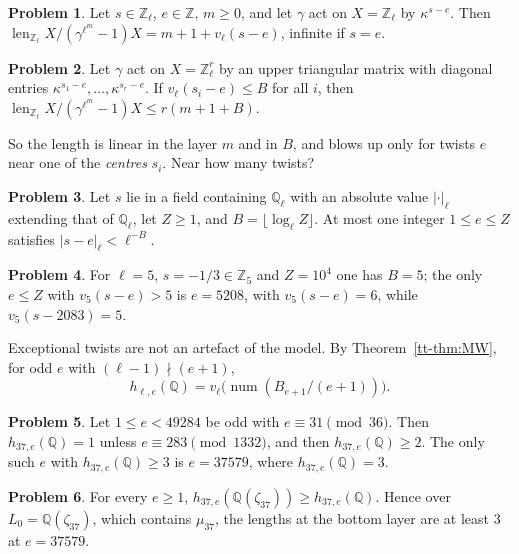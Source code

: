 \documentclass[reqno]{amsart}
\theoremstyle{definition}
\newtheorem{problem}{Problem}[section]
\theoremstyle{plain}
\theoremstyle{remark}
\newcommand{\Z}{\mathbb{Z}}
\newcommand{\Q}{\mathbb{Q}}
\newcommand{\Zl}{\Z_\ell}
\newcommand{\Ql}{\Q_\ell}
\newcommand{\len}{\operatorname{len}}
\newcommand{\num}{\operatorname{num}}
\begin{document}
\begin{problem}\label{pr:rank-one}
Let \(s\in\Zl\), \(e\in\Z\), \(m\ge0\), and let \(\gamma\) act on \(X=\Zl\) by \(\kappa^{s-e}\).  Then \(\len_{\Zl}X/(\gamma^{\ell^m}-1)X=m+1+v_\ell(s-e)\), infinite if \(s=e\).
\end{problem}

\begin{problem}\label{pr:triangular}
Let \(\gamma\) act on \(X=\Zl^r\) by an upper triangular matrix with diagonal entries \(\kappa^{s_1-e},\dots,\kappa^{s_r-e}\).  If \(v_\ell(s_i-e)\le B\) for all \(i\), then \(\len_{\Zl}X/(\gamma^{\ell^m}-1)X\le r(m+1+B)\).
\end{problem}

So the length is linear in the layer \(m\) and in \(B\), and blows up only for twists \(e\) near one of the \emph{centres} \(s_i\).  Near how many twists?

\begin{problem}\label{pr:one-near}
Let \(s\) lie in a field containing \(\Ql\) with an absolute value \(\lvert\cdot\rvert_\ell\) extending that of \(\Ql\), let \(Z\ge1\), and \(B=\lfloor\log_\ell Z\rfloor\).  At most one integer \(1\le e\le Z\) satisfies \(\lvert s-e\rvert_\ell<\ell^{-B}\).
\end{problem}

\begin{problem}\label{pr:one-near-example}
For \(\ell=5\), \(s=-1/3\in\Z_5\) and \(Z=10^4\) one has \(B=5\); the only \(e\le Z\) with \(v_5(s-e)>5\) is \(e=5208\), with \(v_5(s-e)=6\), while \(v_5(s-2083)=5\).
\end{problem}

Exceptional twists are not an artefact of the model.  By Theorem~\ref{tt-thm:MW}, for odd \(e\) with \((\ell-1)\nmid(e+1)\),
\[
 h_{\ell,e}(\Q)=v_\ell\bigl(\num(B_{e+1}/(e+1))\bigr).
\]

\begin{problem}\label{pr:37}
Let \(1\le e<49284\) be odd with \(e\equiv31\pmod{36}\).  Then \(h_{37,e}(\Q)=1\) unless \(e\equiv283\pmod{1332}\), and then \(h_{37,e}(\Q)\ge2\).  The only such \(e\) with \(h_{37,e}(\Q)\ge3\) is \(e=37579\), where \(h_{37,e}(\Q)=3\).
\end{problem}

\begin{problem}\label{pr:37-layer}
For every \(e\ge1\), \(h_{37,e}(\Q(\zeta_{37}))\ge h_{37,e}(\Q)\).  Hence over \(L_0=\Q(\zeta_{37})\), which contains \(\mu_{37}\), the lengths at the bottom layer are at least \(3\) at \(e=37579\).
\end{problem}
\end{document}
